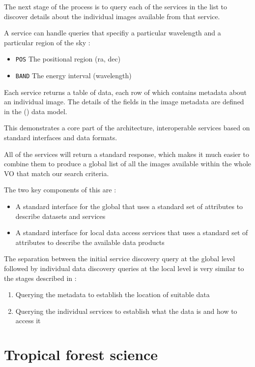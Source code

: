 \documentclass{article}
\begin{document}
The next stage of the process is to query each of the \cite{ivoa.sia} services
in the list to discover details about the individual images available from that
service.

\noindent
A \cite{ivoa.sia} service can handle queries that specifiy a particular wavelength
and a particular region of the sky :
\begin{itemize}
  \item \texttt{POS}  The positional region (ra, dec)
  \item \texttt{BAND} The energy interval (wavelength)
\end{itemize}

Each \cite{ivoa.sia} service returns a table of data, each row of which
contains metadata about an individual image. The details of the fields in the
image metadata are defined in the
 (\cite{ivoa.obscore})
data model.

This demonstrates a core part of the \cite{ivoa} architecture, interoperable services
based on standard interfaces and data formats.

All of the \cite{ivoa.sia} services will return a standard response, which makes
it much easier to combine them to produce a global list of all the images available
within the whole VO that match our search criteria.

\noindent
The two key components of this are :
\begin{itemize}
\item A standard interface for the global \cite{ivoa.reg} that uses a standard
set of attributes to describe datasets and services
\item A standard interface for local \cite{ivoa.sia} data access services that
uses a standard set of attributes to describe the available data products
\end{itemize}

The separation between the initial service discovery query at the global
level followed by individual data discovery queries at the local level
is very similar to the stages described in \cite{jones-2006} :
\begin{enumerate}
  \item Querying the metadata to establish the location of suitable data
  \item Querying the individual services to establish what the data is and how to access it
\end{enumerate}

\section{Tropical forest science}
\end{document}
